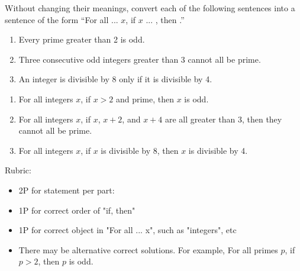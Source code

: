 \documentclass{article}
\theoremstyle{definition}
\begin{document}
\begin{question}{6}
   Without changing their meanings, convert each of the following sentences into a sentence of the form ``For all ... $x$, if $x$ ... , then .''
    \begin{enumerate}
        \item Every prime greater than 2 is odd.
        \item Three consecutive odd integers greater than 3 cannot all be prime.
        \item An integer is divisible by 8 only if it is divisible by 4.
    \end{enumerate}
\end{question}
\begin{solution}
    \begin{enumerate}
        \item For all integers $x$, if $x>2$ and prime, then $x$ is odd. 
        \item For all integers $x$, if $x$, $x+2$, and $x+4$ are all greater than 3, then they cannot all be prime. 
        \item For all integers $x$, if $x$ is divisible by 8, then $x$ is divisible by 4.
    \end{enumerate}

{\color{red} Rubric:
\begin{itemize}
\item 2P for statement per part:
\item 1P for correct order of "if, then"
\item 1P for correct object in "For all ... x", such as "integers", etc
\item There may be alternative correct solutions. For example, For all primes $p$, if $p>2$, then $p$ is odd.
\end{itemize}}
\end{solution}
\end{document}
